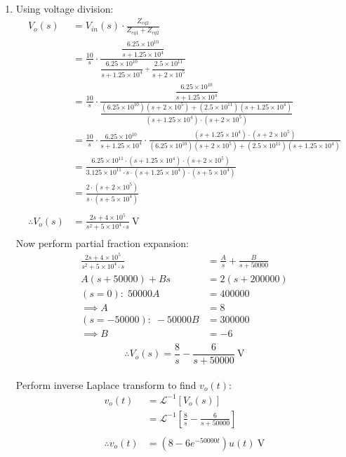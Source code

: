 \begin{enumerate}
	\item{
		Using voltage division:
		\begin{align*}
			V_o(s) &= V_{in}(s) \cdot \frac{Z_{eq2}}{Z_{eq1} + Z_{eq2}}\\
			&= \frac{10}{s} \cdot \frac{\dfrac{6.25 \times 10^{10}}				%
			{s + 1.25 \times 10^4}}{\dfrac{6.25 \times 10^{10}}					%
			{s + 1.25 \times 10^4} + \dfrac{2.5 \times 10^{11}}					%
			{s + 2 \times 10^5}} \\
			&= \frac{10}{s} \cdot \frac{\dfrac{6.25 \times 10^{10}}             %
			{s+1.25 \times 10^4}}{\dfrac{(6.25 \times 10^{10})					%
			(s + 2\times 10^5) + (2.5 \times 10^{11})(s + 1.25 \times 10^4)}	%
			{(s + 1.25 \times 10^4)\cdot(s + 2 \times 10^5)}} \\
			&= \frac{10}{s} \cdot \frac{6.25 \times 10^{10}}            
			{s+1.25 \times 10^4} \cdot \frac{(s + 1.25 \times 10^4)
			\cdot(s + 2 \times 10^5)}{(6.25 \times 10^{10})
			(s + 2\times 10^5) + (2.5 \times 10^{11})
			(s + 1.25 \times 10^4)} \\
			&= \frac{6.25 \times 10^{11} \cdot (s + 1.25 \times 10^4) \cdot 
			(s + 2 \times 10^5)}{3.125 \times 10^{11} \cdot s \cdot 
			(s + 1.25 \times 10^4) \cdot (s + 5 \times 10^4)} \\
			&= \frac{2 \cdot (s + 2 \times 10^5)}
			{s \cdot (s + 5 \times 10^4)} \\ 
			\\
			\therefore V_o(s) &= \frac{2s + 4 \times 10^5}{s^2 + 5 \times 10^4 \cdot s} \ \mathrm{V} \\
		\end{align*}
		Now perform partial fraction expansion:
		\begin{align*}
			\frac{2s + 4 \times 10^5}{s^2 + 5 \times 10^4 \cdot s} &= 
			\frac{A}{s} + \frac{B}{s + 50000} \\
			A(s+50000) + Bs &= 2(s + 200000) \\
			(s = 0): \; 50000A &= 400000 \\
			\implies A &= 8 \\
			(s = -50000): \;  -50000B &= 300000 \\
			\implies B &= -6 \\
		\end{align*}
		\begin{equation*}
			\therefore V_o(s) = \frac{8}{s} - \frac{6}{s + 50000} \ \mathrm{V}
		\end{equation*}
		\\
		Perform inverse Laplace transform to find $v_o(t)$:
		\begin{align*}
			v_o(t) &= \mathcal{L}^{-1} [V_o(s)]\\
			&= \mathcal{L}^{-1} \left[\frac{8}{s} - \frac{6}{s + 50000}\right] \\
			\\
			\therefore v_o(t) &= \left(8 -6 e^{-50000t} \right) u(t) \ \mathrm{V}
		\end{align*}
		\\
	}


\end{enumerate}
